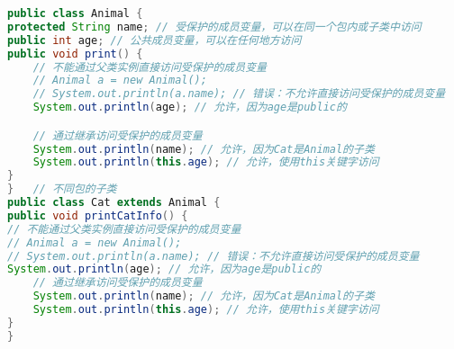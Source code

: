 \documentclass{article}
\begin{document}
\begin{lstlisting}[language=Java, backgroundcolor=\color{lightgray}, frame=single]
public class Animal {
protected String name; // 受保护的成员变量，可以在同一个包内或子类中访问
public int age; // 公共成员变量，可以在任何地方访问 
public void print() {
    // 不能通过父类实例直接访问受保护的成员变量
    // Animal a = new Animal(); 
    // System.out.println(a.name); // 错误：不允许直接访问受保护的成员变量
    System.out.println(age); // 允许，因为age是public的

    // 通过继承访问受保护的成员变量
    System.out.println(name); // 允许，因为Cat是Animal的子类
    System.out.println(this.age); // 允许，使用this关键字访问
}
}   // 不同包的子类
public class Cat extends Animal {
public void printCatInfo() {
// 不能通过父类实例直接访问受保护的成员变量
// Animal a = new Animal();
// System.out.println(a.name); // 错误：不允许直接访问受保护的成员变量
System.out.println(age); // 允许，因为age是public的 
    // 通过继承访问受保护的成员变量
    System.out.println(name); // 允许，因为Cat是Animal的子类
    System.out.println(this.age); // 允许，使用this关键字访问
}
}
\end{lstlisting}
\end{document}
